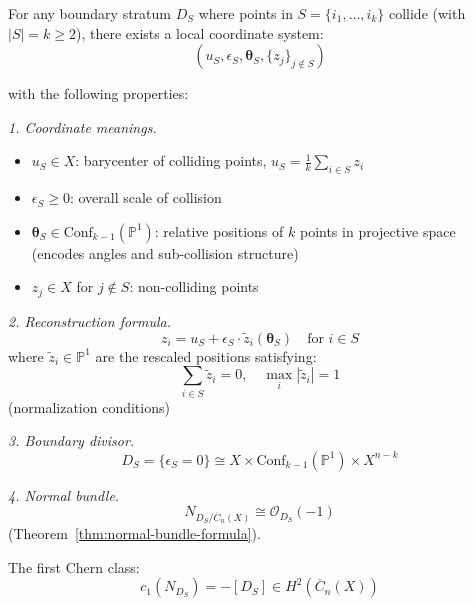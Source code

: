 \begin{theorem}\label{thm:complete-coordinates}
For any boundary stratum $D_S$ where points in $S = \{i_1, \ldots, i_k\}$ collide
(with $|S| = k \geq 2$), there exists a local coordinate system:
\[(u_S, \epsilon_S, \boldsymbol{\theta}_S, \{z_j\}_{j \notin S})\]

with the following properties:

\emph{1. Coordinate meanings.}
\begin{itemize}
\item $u_S \in X$: barycenter of colliding points, $u_S = \frac{1}{k}\sum_{i \in S} z_i$
\item $\epsilon_S \geq 0$: overall scale of collision
\item $\boldsymbol{\theta}_S \in \text{Conf}_{k-1}(\mathbb{P}^1)$: relative positions of
$k$ points in projective space (encodes angles and sub-collision structure)
\item $z_j \in X$ for $j \notin S$: non-colliding points
\end{itemize}

\emph{2. Reconstruction formula.}
\[z_i = u_S + \epsilon_S \cdot \tilde{z}_i(\boldsymbol{\theta}_S) \quad \text{for } i \in S\]
where $\tilde{z}_i \in \mathbb{P}^1$ are the rescaled positions satisfying:
\[\sum_{i \in S} \tilde{z}_i = 0, \quad \max_i |\tilde{z}_i| = 1\]
(normalization conditions)

\emph{3. Boundary divisor.}
\[D_S = \{\epsilon_S = 0\} \cong X \times \text{Conf}_{k-1}(\mathbb{P}^1) \times X^{n-k}\]

\emph{4. Normal bundle.}
\[N_{D_S/\overline{C}_n(X)} \cong \mathcal{O}_{D_S}(-1)\]
(Theorem~\ref{thm:normal-bundle-formula}).

The first Chern class:
\[c_1(N_{D_S}) = -[D_S] \in H^2(\overline{C}_n(X))\]
\end{theorem}

